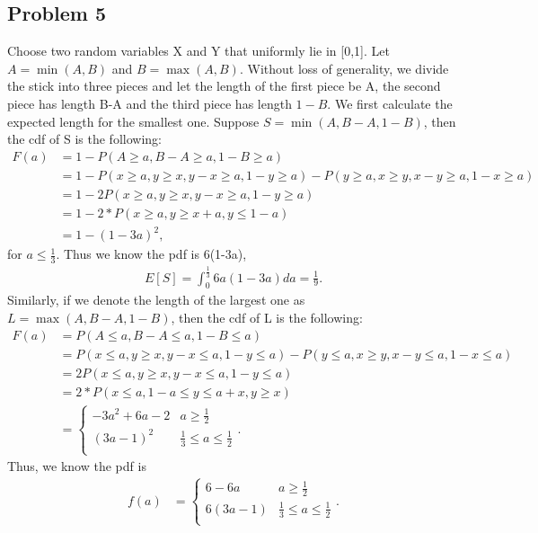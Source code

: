 \documentclass[11pt]{article}
\theoremstyle{remark}
\begin{document}
\subsection{Problem 5}
Choose two random variables X and Y that uniformly lie in [0,1]. Let $A=\min(A,B)$ and $B=\max(A,B)$. Without loss of generality, we divide the stick into three pieces and let the length of the first piece be A, the second piece has length B-A and the third piece has length $1-B$. We first calculate the expected length for the smallest one. Suppose $S=\min(A,B-A,1-B)$, then the cdf of S is the following:
\begin{align}
F(a) &= 1 - P(A\geq a, B-A\geq a, 1-B\geq a) \nonumber \\
&=1-P(x\geq a, y\geq x, y-x \geq a, 1- y\geq a) - P(y\geq a, x\geq y, x-y\geq a, 1-x\geq a) \nonumber \\
&=1-2 P(x\geq a, y\geq x, y-x \geq a, 1- y\geq a) \nonumber \\
&=1-2 * P(x\geq a, y\geq x+a, y\leq 1-a) \nonumber \\
&=1-(1-3a)^{2}, \nonumber 
\end{align}
for $a\leq \frac{1}{3}$. Thus we know the pdf is 6(1-3a), 
\begin{align}
E[S]=\int_{0}^{\frac{1}{3}}6a(1-3a)da=\frac{1}{9}. \nonumber 
\end{align}
Similarly, if we denote the length of the largest one as $L=\max(A,B-A,1-B)$, then the cdf of L is the following:
\begin{align}
F(a) &= P(A\leq a, B-A\leq a, 1-B\leq a) \nonumber \\
&=P(x\leq a, y\geq x, y-x \leq  a, 1- y\leq a) - P(y\leq a, x\geq y, x-y\leq a, 1-x\leq a) \nonumber \\
&=2 P(x\leq a, y\geq x, y-x \leq a, 1- y\leq a) \nonumber \\
&=2 * P(x\leq a, 1-a \leq y\leq a+x, y\geq x) \nonumber \\
&=\begin{cases}
    -3a^{2}+6a-2      & a\geq \frac{1}{2}\\
    (3a-1)^{2}  & \frac{1}{3}\leq a\leq \frac{1}{2}\\
  \end{cases}. \nonumber 
\end{align}
Thus, we know the pdf is
\begin{align}
f(a)&=\begin{cases}
    6-6a      & a\geq \frac{1}{2}\\
    6(3a-1)  & \frac{1}{3}\leq a\leq \frac{1}{2}\\
  \end{cases}. \nonumber 
\end{align}
\end{document}
